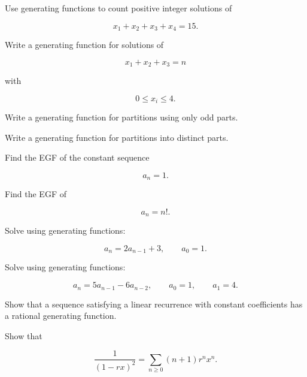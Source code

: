 \begin{exercise}[2]
Use generating functions to count positive integer solutions of

\[
x_1+x_2+x_3+x_4=15.
\]
\end{exercise}

\begin{exercise}[2]
Write a generating function for solutions of

\[
x_1+x_2+x_3=n
\]

with

\[
0\leq x_i\leq4.
\]
\end{exercise}

\begin{exercise}[2]
Write a generating function for partitions using only odd parts.
\end{exercise}

\begin{exercise}[2]
Write a generating function for partitions into distinct parts.
\end{exercise}

\begin{exercise}[2]
Find the EGF of the constant sequence

\[
a_n=1.
\]
\end{exercise}

\begin{exercise}[2]
Find the EGF of

\[
a_n=n!.
\]
\end{exercise}

\begin{exercise}[3]
Solve using generating functions:

\[
a_n=2a_{n-1}+3,
\qquad
a_0=1.
\]
\end{exercise}

\begin{exercise}[3]
Solve using generating functions:

\[
a_n=5a_{n-1}-6a_{n-2},
\qquad
a_0=1,
\qquad
a_1=4.
\]
\end{exercise}

\begin{exercise}[3]
Show that a sequence satisfying a linear recurrence with constant
coefficients has a rational generating function.
\end{exercise}

\begin{exercise}[3]
Show that

\[
\frac{1}{(1-rx)^2}
=
\sum_{n\geq0}(n+1)r^nx^n.
\]
\end{exercise}

